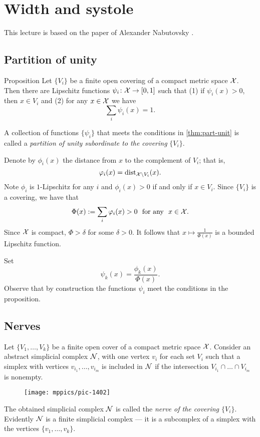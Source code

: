 \chapter{Width and systole}

This lecture is based on the paper of Alexander Nabutovsky \cite{nabutovsky}.

\section{Partition of unity}

\begin{thm}{Proposition}\label{thm:part-unit}
 Let $\{V_i\}$ be a finite open covering of a compact metric space ${\mathcal{X}}$.
Then there are Lipschitz functions $\psi_i\:{\spc{X}}\z\to[0,1]$ such that (1) if $\psi_i(x)>0$, then $x\in V_i$ and (2) for any $x\in {\mathcal{X}}$ we have
$$\sum_i\psi_i(x)=1.$$

\end{thm}

A collection of functions $\{\psi_i\}$ that meets the conditions in \ref{thm:part-unit} is called 
a \emph{partition of unity subordinate to the covering} $\{V_i\}$.

Denote by $\phi_i(x)$ the distance from $x$ to the complement of $V_i$;
that is,
$$\varphi_i(x)=\mathrm{dist}_{{\mathcal{X}}\setminus V_i}(x).$$
Note $\phi_i$ is $1$-Lipschitz
for any $i$
and $\phi_i(x)>0$ if and only if $x\in V_i$.
Since $\{V_i\}$ is a covering, we have that
$$\Phi(x)\df\sum_i\phi_i(x)>0\ \ \text{for any}\ \ x\in {\spc{X}}.$$
Since $\mathcal{X}$ is compact, $\Phi>\delta$ for some $\delta>0$.
It follows that $x\mapsto\tfrac1{\Phi(x)}$ is a bounded Lipschitz function. 

Set 
$$\psi_k(x)=\frac{\phi_k(x)}{\Phi(x)}.$$
Observe that by construction the functions $\psi_i$ meet the conditions in the proposition.
\qedsf

\section{Nerves}

Let $\{V_1,\dots,V_k\}$ be a finite open cover of a compact metric space $\mathcal{X}$.
Consider an abstract simplicial complex $\mathcal{N}$, with one vertex $v_i$ for each set $V_i$ such that a simplex with vertices $v_{i_1},\dots, v_{i_m}$ is included in $\mathcal{N}$ if 
the intersection $V_{i_1}\cap\dots\cap V_{i_m}$ is nonempty.
\begin{figure}[ht!]
\vskip-0mm
\centering
\texttt{[image: mppics/pic-1402]}
\end{figure}
The obtained simplicial complex $\mathcal{N}$ is called the \emph{nerve of the covering $\{V_i\}$}.
Evidently $\mathcal{N}$ is a finite simplicial complex ---
it is a subcomplex of a simplex with the vertices $\{v_1,\dots,v_k\}$.

